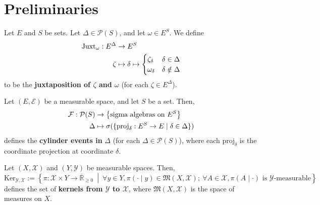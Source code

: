 \section{Preliminaries}

\begin{definition}[Juxtaposition]
    \label{def:juxtaposition}
    \leanok

    Let $E$ and $S$ be sets. Let $\Delta\in\mathcal{P}(S)$, and let $\omega\in E^S$. We define
    \begin{align}
        \operatorname{Juxt}_{\omega} : E^\Delta&\to E^S\\
        \zeta&\mapsto \delta\mapsto\begin{cases}
            \zeta_\delta & \delta\in\Delta\\
            \omega_\delta & \delta\notin\Delta
        \end{cases}
    \end{align}
    to be the \textbf{juxtaposition of $\zeta$ and $\omega$} (for each $\zeta\in E^\Delta$).
\end{definition}

\begin{definition}
    \label{def:cylinder-event}
    \leanok

    Let $(E,\mathcal{E})$ be a measurable space, and let $S$ be a set. Then,
    \begin{align}
        \mathcal{F}:\mathcal{P}(S)&\to \left\{ \text{sigma algebras on } E^S \right\}\\
        \Delta&\mapsto \sigma(\{\text{proj}_\delta:E^S\to E\mid \delta\in \Delta\})
    \end{align}
    defines the \textbf{cylinder events in }$\Delta$ (for each $\Delta\in\mathcal{P}(S)$),
    where each $\text{proj}_\delta$ is the coordinate projection at coordinate $\delta$.
\end{definition}

\begin{definition}[Kernel]
    \label{def:kernel}
    \leanok

    Let $(X,\mathcal{X})$ and $(Y,\mathcal{Y})$ be measurable spaces. Then,
    \begin{equation*}
        \text{Ker}_{\mathcal{Y},\mathcal{X}}:=\left\{\pi:\mathcal{X}\times Y\to\overline{\mathbb{R}}_{\geq0}~\middle\vert~ \forall y\in Y,\pi(\cdot\mid y)\in\mathfrak{M}(X,\mathcal{X});~\forall A\in\mathcal{X},\pi(A\mid\cdot)\text{ is }\mathcal{Y}\text{-measurable}\right\}
    \end{equation*}
    defines the set of \textbf{kernels from $\mathcal{Y}$ to $\mathcal{X}$}, where $\mathfrak{M}(X,\mathcal{X})$ is the space of measures on $X$.

\end{definition}

